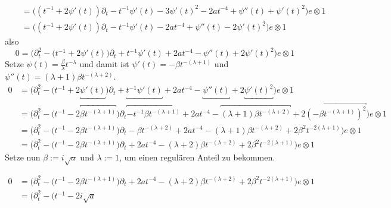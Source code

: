 \begin{try}
\begin{align*}
\begin{aligned}
\\\end{aligned}
\\&= \Big((t^{-1} + 2\psi'(t))\partial_t
    - t^{-1} \psi'(t) - 3\psi'(t)^2 - 2at^{-4} + \psi''(t)
    + \psi'(t)^2\Big) e\otimes 1
\\&= \Big((t^{-1} + 2\psi'(t))\partial_t
    - t^{-1} \psi'(t) - 2at^{-4} + \psi''(t)
    - 2 \psi'(t)^2\Big) e\otimes 1
\end{align*}
also
\[
0 = \Big(\partial_t^2 - \big(t^{-1} + 2\psi'(t)\big)\partial_t
    + t^{-1} \psi'(t) + 2at^{-4} -\psi''(t)
    + 2 \psi'(t)^2\Big) e\otimes 1
\]
Setze $\psi(t)=\frac{\beta}{\lambda}t^{-\lambda}$ und damit ist 
$\psi'(t)=-\beta t^{-(\lambda+1)}$ und
$\psi''(t)=(\lambda+1)\beta t^{-(\lambda+2)}$.
\begin{align*}
0 &= \Big(\partial_t^2 - \big(t^{-1} + 2\underbracket{\psi'(t)}\big)\partial_t
   + \underbracket{t^{-1} \psi'(t)} + 2at^{-4} -\underbracket{\psi''(t)}
   + 2 \underbracket{\psi'(t)^2}\Big) e\otimes 1
\\&= \Big(\partial_t^2 - \big(t^{-1} 
   - 2\overbracket{\beta t^{-(\lambda+1)}}\big)\partial_t
   \overbracket{- t^{-1} \beta t^{-(\lambda+1)}} + 2at^{-4} 
   - \overbracket{(\lambda+1)\beta t^{-(\lambda+2)}}
   + 2 \overbracket{(-\beta t^{-(\lambda+1)})^2}\Big) e\otimes 1
\\&= \Big(\partial_t^2 - \big(t^{-1} - 2\beta t^{-(\lambda+1)}\big)\partial_t
   - \beta t^{-(\lambda+2)} + 2at^{-4} - (\lambda+1)\beta t^{-(\lambda+2)}
   + 2 \beta^2 t^{-2(\lambda+1)}\Big) e\otimes 1
\\&= \Big(\partial_t^2 - \big(t^{-1} - 2\beta t^{-(\lambda+1)}\big)\partial_t
   + 2at^{-4} - (\lambda+2)\beta t^{-(\lambda+2)}
   + 2 \beta^2 t^{-2(\lambda+1)}\Big) e\otimes 1
\end{align*}
Setze nun $\beta:=i\sqrt{a}$ und $\lambda:=1$, um einen regulären Anteil zu
bekommen.
\begin{comment}
TODO: $\lambda=\lambda_0$ ??
\end{comment}
\begin{align*}
0 &= \Big(\partial_t^2 - \big(t^{-1} - 2\beta t^{-(\lambda+1)}\big)\partial_t
   + 2at^{-4} - (\lambda+2)\beta t^{-(\lambda+2)}
   + 2 \beta^2 t^{-2(\lambda+1)}\Big) e\otimes 1
\\&= \Big(\partial_t^2 - \big(t^{-1} - 2i\sqrt{a}

\end{align*}
\end{try}
